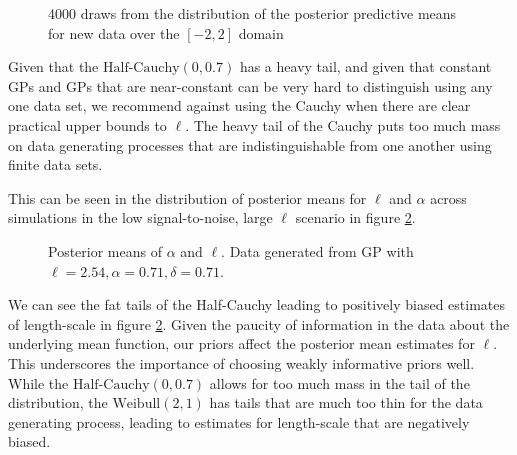 \documentclass{article}
\begin{document}
\begin{figure}[htbp]
  \centering
  \caption{4000 draws from the distribution of the posterior predictive means for new data over the $[-2,2]$ domain} \label{gp_set_3_post_pred_cauchy}
\end{figure}
Given that the $\text{Half-Cauchy}(0, 0.7)$ has a heavy tail, and given that
constant GPs and GPs that are near-constant can be very hard to distinguish
using any one data set, we recommend against using the Cauchy when there are
clear practical upper bounds to $\ell$. The heavy tail of the Cauchy puts too
much mass on data generating processes that are indistinguishable from one
another using finite data sets.

This can be seen in the distribution of posterior means for $\ell$ and $\alpha$
across simulations in the low signal-to-noise, large $\ell$ scenario in figure \ref{joint_len_alpha}. 
\begin{figure}[htbp]
  \centering
  \caption{Posterior means of $\alpha$ and $\ell$. Data generated from GP with $\ell = 2.54, \alpha = 0.71, \delta = 0.71$.} \label{joint_len_alpha}
\end{figure}
We can see the fat tails of the Half-Cauchy leading to positively biased
estimates of length-scale in figure \ref{joint_len_alpha}. Given the paucity of
information in the data about the underlying mean function, our priors affect
the posterior mean estimates for $\ell$. This underscores the importance of
choosing weakly informative priors well. While the $\text{Half-Cauchy}(0, 0.7)$
allows for too much mass in the tail of the distribution, the
$\text{Weibull}(2, 1)$ has tails that are much too thin for the data generating
process, leading to estimates for length-scale that are negatively biased.
\end{document}
